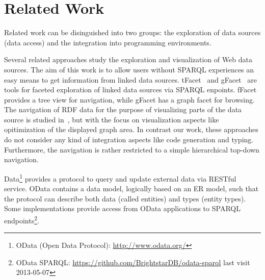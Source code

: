 \documentclass{llncs} %
\begin{document}
\section{Related Work}
\label{sec:rw}

Related work can be disinguished into two groups: the exploration of data sources (data access)
and the integration into programming environments.

Several related approaches study the exploration and visualization of Web data sources. 
The aim of this work is to allow users without SPARQL experiences an easy means to
get information from linked data sources.
tFacet~\cite{tFacet} and gFacet~\cite{heim2008gfacet} are tools for faceted exploration of linked data sources
via SPARQL enpoints. fFacet provides a tree view for navigation, while gFacet has a graph facet for browsing.
The navigation of RDF data for the purpose of visualizing parts of the data source is studied in~\cite{DBLP:conf/iv/DokulilK08},
but with the focus on visualization aspects like opitimization of the displayed graph area.
In contrast our work, these approaches do not consider any kind of integration aspects like code generation and typing.
Furthermore, the navigation is rather restricted to a simple hierarchical top-down navigation.

Data\footnote{OData (Open Data Protocol): \url{http://www.odata.org/}}  provides a protocol to query and update external data via RESTful service.
OData contains a data model, logically based on an ER model, such that the protocol can describe both data (called entities) and types (entity types).
Some implementations provide access from OData applications to SPARQL endpoints\footnote{OData SPARQL: \url{https://github.com/BrightstarDB/odata-sparql} last visit 2013-05-07}.



 
\end{document}
